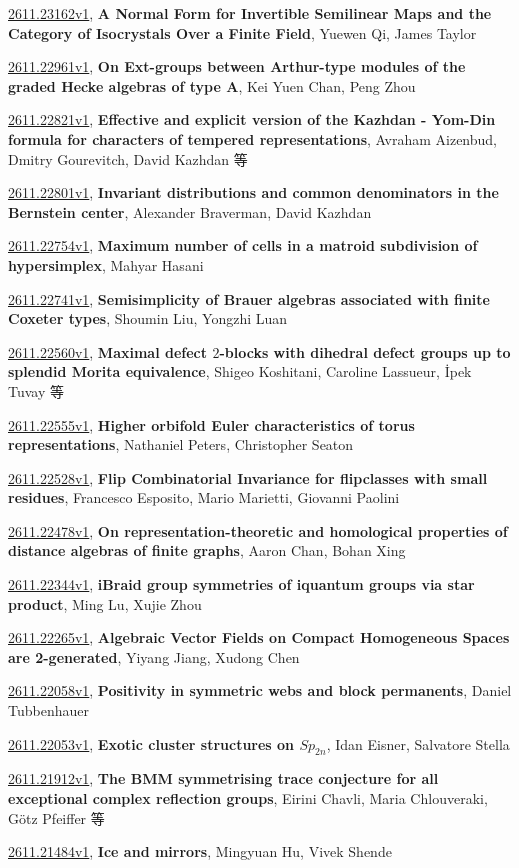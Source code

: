 \documentclass[9pt, a4paper]{article}
\theoremstyle{plain}
\theoremstyle{definition}
\theoremstyle{remark}
\newcommand{\arxiv}[3]{\href{https://arxiv.org/abs/#1}{#1}, \textbf{\textcolor{arxivblue}{#2}}, #3}
\begin{document}
\arxiv{2611.23162v1}{A Normal Form for Invertible Semilinear Maps and the Category of Isocrystals Over a Finite Field}{Yuewen Qi, James Taylor}

\arxiv{2611.22961v1}{On Ext-groups between Arthur-type modules of the graded Hecke algebras of type A}{Kei Yuen Chan, Peng Zhou}

\arxiv{2611.22821v1}{Effective and explicit version of the Kazhdan - Yom-Din formula for characters of tempered representations}{Avraham Aizenbud, Dmitry Gourevitch, David Kazhdan 等}

\arxiv{2611.22801v1}{Invariant distributions and common denominators in the Bernstein center}{Alexander Braverman, David Kazhdan}

\arxiv{2611.22754v1}{Maximum number of cells in a matroid subdivision of hypersimplex}{Mahyar Hasani}

\arxiv{2611.22741v1}{Semisimplicity of Brauer algebras associated with finite Coxeter types}{Shoumin Liu, Yongzhi Luan}

\arxiv{2611.22560v1}{Maximal defect $2$-blocks with dihedral defect groups up to splendid Morita equivalence}{Shigeo Koshitani, Caroline Lassueur, İpek Tuvay 等}

\arxiv{2611.22555v1}{Higher orbifold Euler characteristics of torus representations}{Nathaniel Peters, Christopher Seaton}

\arxiv{2611.22528v1}{Flip Combinatorial Invariance for flipclasses with small residues}{Francesco Esposito, Mario Marietti, Giovanni Paolini}

\arxiv{2611.22478v1}{On representation-theoretic and homological properties of distance algebras of finite graphs}{Aaron Chan, Bohan Xing}

\arxiv{2611.22344v1}{iBraid group symmetries of iquantum groups via star product}{Ming Lu, Xujie Zhou}

\arxiv{2611.22265v1}{Algebraic Vector Fields on Compact Homogeneous Spaces are 2-generated}{Yiyang Jiang, Xudong Chen}

\arxiv{2611.22058v1}{Positivity in symmetric webs and block permanents}{Daniel Tubbenhauer}

\arxiv{2611.22053v1}{Exotic cluster structures on $Sp_{2n}$}{Idan Eisner, Salvatore Stella}

\arxiv{2611.21912v1}{The BMM symmetrising trace conjecture for all exceptional complex reflection groups}{Eirini Chavli, Maria Chlouveraki, Götz Pfeiffer 等}

\arxiv{2611.21484v1}{Ice and mirrors}{Mingyuan Hu, Vivek Shende}
\end{document}
